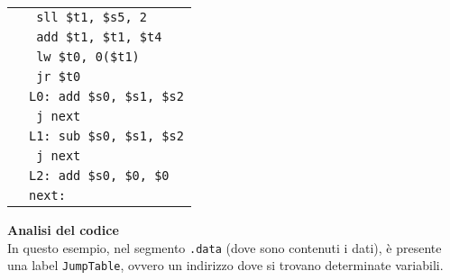 \documentclass[../main.tex]{subfiles}
\begin{document}
\begin{tabular}{ p{8cm} p{8cm} }
    & \texttt{ \hspace*{0cm} \hspace*{0cm} \hspace*{0cm} \hspace*{0cm} sll \$t1, \$s5, 2} \\
    & \texttt{ \hspace*{0cm} \hspace*{0cm} \hspace*{0cm} \hspace*{0cm} add \$t1, \$t1, \$t4} \\
    & \texttt{ \hspace*{0cm} \hspace*{0cm} \hspace*{0cm} \hspace*{0cm} lw \$t0, 0(\$t1)} \\
    & \texttt{ \hspace*{0cm} \hspace*{0cm} \hspace*{0cm} \hspace*{0cm} jr \$t0} \\
    & \texttt{L0: add \$s0, \$s1, \$s2} \\
    & \texttt{ \hspace*{0cm} \hspace*{0cm} \hspace*{0cm} \hspace*{0cm} j next} \\
    & \texttt{L1:\hspace*{2.1mm} sub \$s0, \$s1, \$s2} \\
    & \texttt{ \hspace*{0cm} \hspace*{0cm} \hspace*{0cm} \hspace*{0cm} j next} \\
    & \texttt{L2:\hspace*{2.1mm} add \$s0, \$0, \$0} \\
    & \texttt{next:} \\
\end{tabular}

\vspace*{5mm}

\noindent
\textbf{Analisi del codice}
\\[1mm]
In questo esempio, nel segmento \texttt{.data} (dove sono contenuti i dati),
è presente una label \texttt{JumpTable}, ovvero un indirizzo
dove si trovano determinate variabili.
\end{document}
